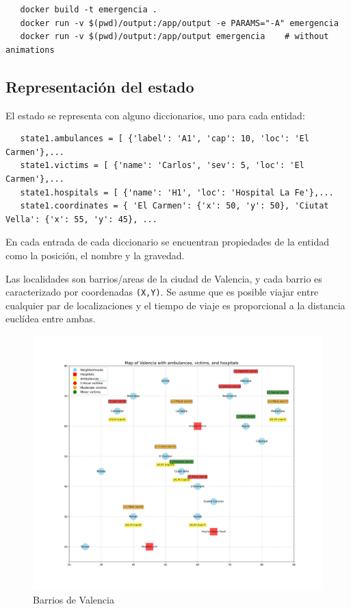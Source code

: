 \begin{verbatim}
   docker build -t emergencia .
   docker run -v $(pwd)/output:/app/output -e PARAMS="-A" emergencia
   docker run -v $(pwd)/output:/app/output emergencia    # without animations
\end{verbatim}



\subsection{Representación del estado}
El estado se representa con alguno diccionarios, uno para cada entidad:
\begin{lstlisting}
   state1.ambulances = [ {'label': 'A1', 'cap': 10, 'loc': 'El Carmen'},...
   state1.victims = [ {'name': 'Carlos', 'sev': 5, 'loc': 'El Carmen'},...
   state1.hospitals = [ {'name': 'H1', 'loc': 'Hospital La Fe'},...
   state1.coordinates = { 'El Carmen': {'x': 50, 'y': 50}, 'Ciutat Vella': {'x': 55, 'y': 45}, ...
\end{lstlisting}
En cada entrada de cada diccionario se encuentran propiedades de la entidad como la posición, el nombre y la gravedad.

Las localidades son barrios/areas de la ciudad de Valencia, y cada barrio es caracterizado por coordenadas \lstinline|(X,Y)|.
Se asume que es posible viajar entre cualquier par de localizaciones y el tiempo de viaje es proporcional a la distancia euclídea entre ambas.
\begin{figure}[htbp]
   \centering
   \includegraphics{images/valencia_map.png}
   \caption{Barrios de Valencia}
   \label{fig:valencia_map}
\end{figure}

